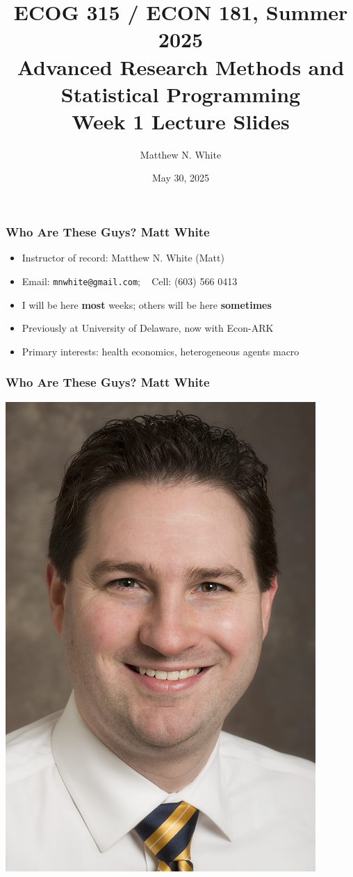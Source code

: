 \documentclass[aspectratio=169]{beamer}
\author{Matthew N. White}
\title[add]{ECOG 315 / ECON 181, Summer 2025 \\ Advanced Research Methods and Statistical Programming \\ Week 1 Lecture Slides}
\institute[HU]{Howard University}
\date{May 30, 2025}
\begin{document}
\begin{frame}
\maketitle
\end{frame}


\begin{frame}
\frametitle{Who Are These Guys? Matt White}
\begin{itemize}
	\item Instructor of record: Matthew N. White (Matt)
	
	\item Email: \texttt{mnwhite@gmail.com}; ~ Cell: (603) 566 0413
	
	\item I will be here \textbf{most} weeks; others will be here \textbf{sometimes}
	
	\item Previously at University of Delaware, now with Econ-ARK
	
	\item Primary interests: health economics, heterogeneous agents macro
\end{itemize}
\end{frame}

\begin{frame}
\frametitle{Who Are These Guys? Matt White}
\centering
\includegraphics[scale=0.4]{../../media/matt-white.png}
\end{frame}
\end{document}

